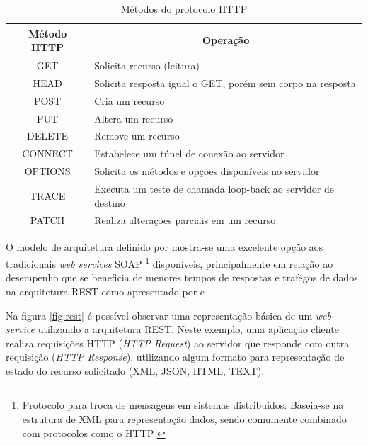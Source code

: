 \begin{table}[H]
\begin{tabular}{c|l}
\textbf{Método HTTP} & \multicolumn{1}{c}{\textbf{Operação}}                        \\ \hline
GET                  & Solicita recurso (leitura)                                   \\
HEAD                 & Solicita resposta igual o GET, porém sem corpo na resposta   \\
POST                 & Cria um recurso                                              \\
PUT                  & Altera um recurso                                            \\
DELETE               & Remove um recurso                                            \\
CONNECT              & Estabelece um túnel de conexão ao servidor                   \\
OPTIONS              & Solicita os métodos e opções disponíveis no servidor         \\
TRACE                & Executa um teste de chamada loop-back ao servidor de destino \\
PATCH                & Realiza alterações parciais em um recurso
\end{tabular}
\caption{Métodos do protocolo HTTP}
\label{tableref:metodoHttp}
\end{table}

O modelo de arquitetura definido por  mostra-se uma excelente opção aos tradicionais \textit{web services} SOAP \footnote{Protocolo para troca de mensagens em sistemas distribuídos. Baseia-se na estrutura de XML para representação dados, sendo comumente combinado com protocolos como o HTTP \cite{box2000simple}} disponíveis, principalmente em relação ao desempenho que se beneficia de menores tempos de respostas e trafégos de dados na arquitetura REST como apresentado por  e .
	
Na figura \ref{fig:rest} é possível observar uma representação básica de um \textit{web service} utilizando a arquitetura REST. Neste exemplo, uma aplicação cliente realiza requisições HTTP (\textit{HTTP Request}) ao servidor que responde com outra requisição (\textit{HTTP Response}), utilizando algum formato para representação de estado do recurso solicitado (XML, JSON, HTML, TEXT).

